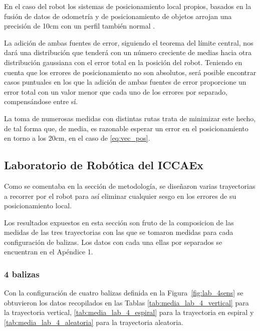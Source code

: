 En el caso del robot los sistemas de posicionamiento local propios, basados en la fusión de datos de odometría y de posicionamiento de objetos arrojan una precisión de 10cm con un perfil también normal \cite{POSRobot}.

La adición de ambas fuentes de error, siguiendo el teorema del límite central, nos dará una distribución que tenderá con un número creciente de medias hacia otra distribución gaussiana con el error total en la posición del robot.
Teniendo en cuenta que los errores de posicionamiento no son absolutos, será posible encontrar casos puntuales en los que la adición de ambas fuentes de error proporcione un error total con un valor menor que cada uno de los errores por separado, compensándose entre sí.

La toma de numerosas medidas con distintas rutas trata de minimizar este hecho, de tal forma que, de media, es razonable esperar un error en el posicionamiento en torno a los 20cm, en el caso de \eqref{eq:vec_pos}.

\subsection{Laboratorio de Robótica del ICCAEx}

Como se comentaba en la sección de metodología, se diseñaron varias trayectorias a recorrer por el robot para así eliminar cualquier sesgo en los errores de su posicionamiento local.

Los resultados expuestos en esta sección son fruto de la composicion de las medidas de las tres trayectorias con las que se tomaron medidas para cada configuración de balizas.
Los datos con cada una ellas por separados se encuentran en el Apéndice 1.

\subsubsection{4 balizas}

Con la configuración de cuatro balizas definida en la Figura~\ref{fig:lab_4sens} se obtuvieron los datos recopilados en las Tablas \ref{tab:media_lab_4_vertical} para la trayectoria vertical, \ref{tab:media_lab_4_espiral} para la trayectoria en espiral y \ref{tab:media_lab_4_aleatoria} para la trayectoria aleatoria.

